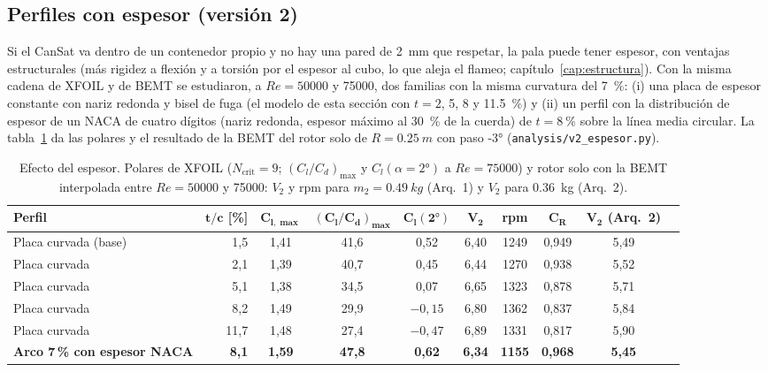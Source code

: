 \subsection{Perfiles con espesor (versión 2)}\label{sec:polares-espesor-v2}
Si el CanSat va dentro de un contenedor propio y no hay una pared de \SI{2}{mm} que respetar, la pala puede tener espesor, con ventajas
estructurales (más rigidez a flexión y a torsión por el espesor al cubo, lo que aleja el flameo; capítulo~\ref{cap:estructura}). Con la misma
cadena de XFOIL y de BEMT se estudiaron, a $Re=\num{50000}$ y \num{75000}, dos familias con la misma curvatura del \SI{7}{\percent}: (i) una
placa de espesor constante con nariz redonda y bisel de fuga (el modelo de esta sección con $t=2$, 5, 8 y \SI{11.5}{\percent}) y (ii) un
perfil con la distribución de espesor de un NACA de cuatro dígitos (nariz redonda, espesor máximo al \SI{30}{\percent} de la cuerda) de
$t=\SI{8}{\percent}$ sobre la línea media circular. La tabla~\ref{tab:polares-espesor-v2} da las polares y el resultado de la BEMT del rotor solo
de $R=\SI{0.25}{m}$ con paso \ang{-3} (\texttt{analysis/v2\_espesor.py}).

\begin{table}[H]
\centering\small
\caption{Efecto del espesor. Polares de XFOIL ($N_{\text{crit}}=9$; $(C_l/C_d)_{\max}$ y $C_l(\alpha=\ang{2})$ a $Re=\num{75000}$) y rotor solo
con la BEMT interpolada entre $Re=\num{50000}$ y \num{75000}: $V_2$ y rpm para $m_2=\SI{0.49}{kg}$ (Arq.~1) y $V_2$ para \SI{0.36}{kg} (Arq.~2).}\label{tab:polares-espesor-v2}
\setlength{\tabcolsep}{2.5pt}
\begin{tabular}{@{}lrcccccccc@{}}
\toprule
\textbf{Perfil} & $\boldsymbol{t/c}$ [\%] & $\boldsymbol{C_{l,\max}}$ & $\boldsymbol{(C_l/C_d)_{\max}}$ & $\boldsymbol{C_l(\ang{2})}$ & $\boldsymbol{V_2}$ & \textbf{rpm} & $\boldsymbol{C_R}$ & $\boldsymbol{V_2}$ (Arq.~2)\\\midrule
Placa curvada (base) & 1,5 & 1,41 & 41,6 & 0,52 & 6,40 & 1249 & 0,949 & 5,49\\
Placa curvada & 2,1 & 1,39 & 40,7 & 0,45 & 6,44 & 1270 & 0,938 & 5,52\\
Placa curvada & 5,1 & 1,38 & 34,5 & 0,07 & 6,65 & 1323 & 0,878 & 5,71\\
Placa curvada & 8,2 & 1,49 & 29,9 & $-0{,}15$ & 6,80 & 1362 & 0,837 & 5,84\\
Placa curvada & 11,7 & 1,48 & 27,4 & $-0{,}47$ & 6,89 & 1331 & 0,817 & 5,90\\
\textbf{Arco 7\,\% con espesor NACA} & \textbf{8,1} & \textbf{1,59} & \textbf{47,8} & \textbf{0,62} & \textbf{6,34} & \textbf{1155} & \textbf{0,968} & \textbf{5,45}\\
\bottomrule
\end{tabular}
\end{table}

